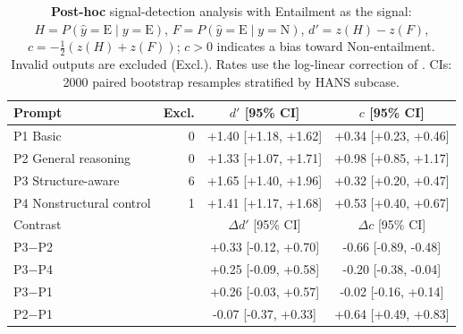 \begin{table}[t]
\centering
\small
\begin{tabular}{lrcc}
\toprule
Prompt & Excl. & $d'$ [95\% CI] & $c$ [95\% CI] \\
\midrule
P1 Basic & 0 & +1.40 [+1.18, +1.62] & +0.34 [+0.23, +0.46] \\
P2 General reasoning & 0 & +1.33 [+1.07, +1.71] & +0.98 [+0.85, +1.17] \\
P3 Structure-aware & 6 & +1.65 [+1.40, +1.96] & +0.32 [+0.20, +0.47] \\
P4 Nonstructural control & 1 & +1.41 [+1.17, +1.68] & +0.53 [+0.40, +0.67] \\
\midrule
Contrast & & $\Delta d'$ [95\% CI] & $\Delta c$ [95\% CI] \\
\midrule
P3$-$P2 & & +0.33 [-0.12, +0.70] & -0.66 [-0.89, -0.48] \\
P3$-$P4 & & +0.25 [-0.09, +0.58] & -0.20 [-0.38, -0.04] \\
P3$-$P1 & & +0.26 [-0.03, +0.57] & -0.02 [-0.16, +0.14] \\
P2$-$P1 & & -0.07 [-0.37, +0.33] & +0.64 [+0.49, +0.83] \\
\bottomrule
\end{tabular}
\caption{\textbf{Post-hoc} signal-detection analysis with Entailment as the signal: $H = P(\hat{y}{=}\mathrm{E}\mid y{=}\mathrm{E})$, $F = P(\hat{y}{=}\mathrm{E}\mid y{=}\mathrm{N})$, $d' = z(H) - z(F)$, $c = -\tfrac{1}{2}(z(H) + z(F))$; $c > 0$ indicates a bias toward Non-entailment. Invalid outputs are excluded (Excl.). Rates use the log-linear correction of \citet{hautus1995corrections}. CIs: 2000 paired bootstrap resamples stratified by HANS subcase.}
\label{tab:sdt}
\end{table}
